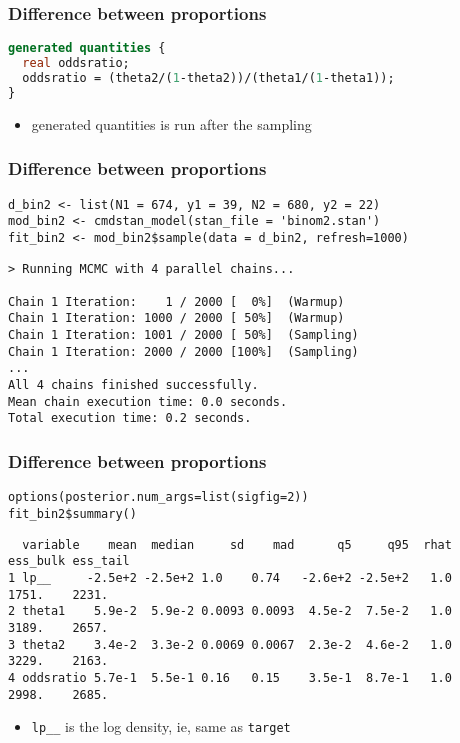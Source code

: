 \documentclass[finnish,english,t]{beamer}
\begin{document}
\begin{frame}[fragile]
  \frametitle{Difference between proportions}

  
  {\small
\begin{lstlisting}[language=Stan]
generated quantities {
  real oddsratio;
  oddsratio = (theta2/(1-theta2))/(theta1/(1-theta1));
}
\end{lstlisting}
    }

    \begin{itemize}
    \item generated quantities is run after the sampling
    \end{itemize}
    
\end{frame}

\begin{frame}[fragile]
  \frametitle{Difference between proportions}
  
  {\small
\begin{lstlisting}[]
d_bin2 <- list(N1 = 674, y1 = 39, N2 = 680, y2 = 22)
mod_bin2 <- cmdstan_model(stan_file = 'binom2.stan')
fit_bin2 <- mod_bin2$sample(data = d_bin2, refresh=1000)
\end{lstlisting}
  }

  {\tiny
\begin{lstlisting}
> Running MCMC with 4 parallel chains...

Chain 1 Iteration:    1 / 2000 [  0%]  (Warmup) 
Chain 1 Iteration: 1000 / 2000 [ 50%]  (Warmup) 
Chain 1 Iteration: 1001 / 2000 [ 50%]  (Sampling) 
Chain 1 Iteration: 2000 / 2000 [100%]  (Sampling) 
...
All 4 chains finished successfully.
Mean chain execution time: 0.0 seconds.
Total execution time: 0.2 seconds.
\end{lstlisting}
  }

\end{frame}

\begin{frame}[fragile]
  \frametitle{Difference between proportions}
  
  {\small
\begin{lstlisting}[]
options(posterior.num_args=list(sigfig=2))
fit_bin2$summary()
\end{lstlisting}
  }

  {\tiny
\begin{lstlisting}
  variable    mean  median     sd    mad      q5     q95  rhat ess_bulk ess_tail
1 lp__     -2.5e+2 -2.5e+2 1.0    0.74   -2.6e+2 -2.5e+2   1.0    1751.    2231.
2 theta1    5.9e-2  5.9e-2 0.0093 0.0093  4.5e-2  7.5e-2   1.0    3189.    2657.
3 theta2    3.4e-2  3.3e-2 0.0069 0.0067  2.3e-2  4.6e-2   1.0    3229.    2163.
4 oddsratio 5.7e-1  5.5e-1 0.16   0.15    3.5e-1  8.7e-1   1.0    2998.    2685.
\end{lstlisting}
  }

  \begin{itemize}
  \item<2-> {\tt lp\_\_} is the log density, ie, same as {\tt target}
  \end{itemize}

\end{frame}
\end{document}
